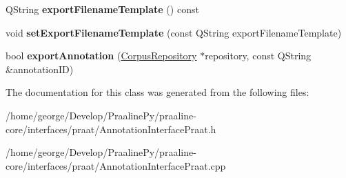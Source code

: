 \begin{DoxyCompactItemize}
\item 
\mbox{\label{class_annotation_interface_praat_a6b1918a75fc7b312c0ad63e60124375e}} 
Q\+String {\bfseries export\+Filename\+Template} () const
\item 
\mbox{\label{class_annotation_interface_praat_a9cf89ed08c8f4264147509259e93dce4}} 
void {\bfseries set\+Export\+Filename\+Template} (const Q\+String export\+Filename\+Template)
\item 
\mbox{\label{class_annotation_interface_praat_a6c6c5347e661546f386fc437e7d46c6d}} 
bool {\bfseries export\+Annotation} (\hyperlink{class_corpus_repository}{Corpus\+Repository} $\ast$repository, const Q\+String \&annotation\+ID)
\end{DoxyCompactItemize}


The documentation for this class was generated from the following files\+:\begin{DoxyCompactItemize}
\item 
/home/george/\+Develop/\+Praaline\+Py/praaline-\/core/interfaces/praat/Annotation\+Interface\+Praat.\+h\item 
/home/george/\+Develop/\+Praaline\+Py/praaline-\/core/interfaces/praat/Annotation\+Interface\+Praat.\+cpp\end{DoxyCompactItemize}
